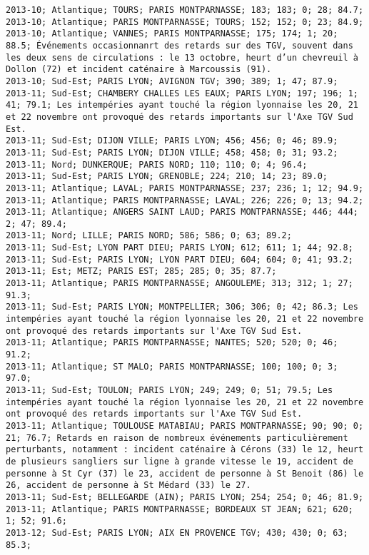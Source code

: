 \documentclass{article}
\begin{document}
\begin{Verbatim}[commandchars=\\\{\}]
2013-10; Atlantique; TOURS; PARIS MONTPARNASSE; 183; 183; 0; 28; 84.7; 
2013-10; Atlantique; PARIS MONTPARNASSE; TOURS; 152; 152; 0; 23; 84.9; 
2013-10; Atlantique; VANNES; PARIS MONTPARNASSE; 175; 174; 1; 20; 88.5; Événements occasionnanrt des retards sur des TGV, souvent dans les deux sens de circulations : le 13 octobre, heurt d’un chevreuil à Dollon (72) et incident caténaire à Marcoussis (91).
2013-10; Sud-Est; PARIS LYON; AVIGNON TGV; 390; 389; 1; 47; 87.9; 
2013-11; Sud-Est; CHAMBERY CHALLES LES EAUX; PARIS LYON; 197; 196; 1; 41; 79.1; Les intempéries ayant touché la région lyonnaise les 20, 21 et 22 novembre ont provoqué des retards importants sur l'Axe TGV Sud Est.
2013-11; Sud-Est; DIJON VILLE; PARIS LYON; 456; 456; 0; 46; 89.9; 
2013-11; Sud-Est; PARIS LYON; DIJON VILLE; 458; 458; 0; 31; 93.2; 
2013-11; Nord; DUNKERQUE; PARIS NORD; 110; 110; 0; 4; 96.4; 
2013-11; Sud-Est; PARIS LYON; GRENOBLE; 224; 210; 14; 23; 89.0; 
2013-11; Atlantique; LAVAL; PARIS MONTPARNASSE; 237; 236; 1; 12; 94.9; 
2013-11; Atlantique; PARIS MONTPARNASSE; LAVAL; 226; 226; 0; 13; 94.2; 
2013-11; Atlantique; ANGERS SAINT LAUD; PARIS MONTPARNASSE; 446; 444; 2; 47; 89.4; 
2013-11; Nord; LILLE; PARIS NORD; 586; 586; 0; 63; 89.2; 
2013-11; Sud-Est; LYON PART DIEU; PARIS LYON; 612; 611; 1; 44; 92.8; 
2013-11; Sud-Est; PARIS LYON; LYON PART DIEU; 604; 604; 0; 41; 93.2; 
2013-11; Est; METZ; PARIS EST; 285; 285; 0; 35; 87.7; 
2013-11; Atlantique; PARIS MONTPARNASSE; ANGOULEME; 313; 312; 1; 27; 91.3; 
2013-11; Sud-Est; PARIS LYON; MONTPELLIER; 306; 306; 0; 42; 86.3; Les intempéries ayant touché la région lyonnaise les 20, 21 et 22 novembre ont provoqué des retards importants sur l'Axe TGV Sud Est.
2013-11; Atlantique; PARIS MONTPARNASSE; NANTES; 520; 520; 0; 46; 91.2; 
2013-11; Atlantique; ST MALO; PARIS MONTPARNASSE; 100; 100; 0; 3; 97.0; 
2013-11; Sud-Est; TOULON; PARIS LYON; 249; 249; 0; 51; 79.5; Les intempéries ayant touché la région lyonnaise les 20, 21 et 22 novembre ont provoqué des retards importants sur l'Axe TGV Sud Est.
2013-11; Atlantique; TOULOUSE MATABIAU; PARIS MONTPARNASSE; 90; 90; 0; 21; 76.7; Retards en raison de nombreux événements particulièrement perturbants, notamment : incident caténaire à Cérons (33) le 12, heurt de plusieurs sangliers sur ligne à grande vitesse le 19, accident de personne à St Cyr (37) le 23, accident de personne à St Benoit (86) le 26, accident de personne à St Médard (33) le 27.
2013-11; Sud-Est; BELLEGARDE (AIN); PARIS LYON; 254; 254; 0; 46; 81.9; 
2013-11; Atlantique; PARIS MONTPARNASSE; BORDEAUX ST JEAN; 621; 620; 1; 52; 91.6; 
2013-12; Sud-Est; PARIS LYON; AIX EN PROVENCE TGV; 430; 430; 0; 63; 85.3; 

\end{Verbatim}
\end{document}
